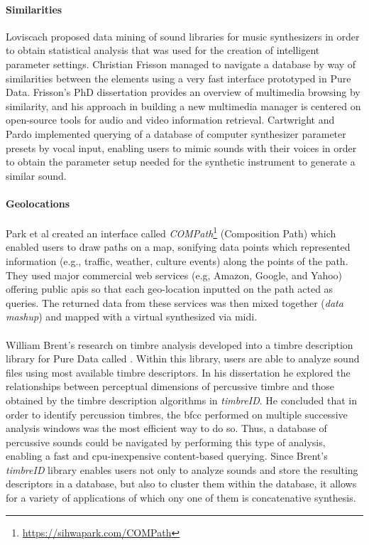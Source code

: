 \paragraph{Similarities}
Loviscach \parencite{Loviscach2008} proposed data mining of sound libraries for music synthesizers in order to obtain statistical analysis that was used for the creation of intelligent parameter settings. Christian Frisson \parencite{Frisson2010} managed to navigate a database by way of similarities between the elements using a very fast interface prototyped in Pure Data. Frisson's PhD dissertation \parencite{Frisson2015} provides an overview of multimedia browsing by similarity, and his approach in building a new multimedia manager is centered on open-source tools for audio and video information retrieval. Cartwright and Pardo \parencite{mcartwright:2014} implemented querying of a database of computer synthesizer parameter presets by vocal input, enabling users to mimic sounds with their voices in order to obtain the parameter setup needed for the synthetic instrument to generate a similar sound.

\paragraph{Geolocations}
Park et al \parencite{icmc/bbp2372.2010.002} created an interface called \textit{COMPath}\footnote{\url{https://sihwapark.com/COMPath}} (Composition Path) which enabled users to draw paths on a map, sonifying data points which represented information (e.g., traffic, weather, culture events) along the points of the path. They used major commercial web services (e.g, Amazon, Google, and Yahoo) offering public \glspl{api} so that each geo-location inputted on the path acted as queries. The returned data from these services was then mixed together (\textit{data mashup}) and mapped with a virtual synthesized via \gls{midi}.

\paragraph{}
William Brent's research on timbre analysis \parencite{Brent/2010/phdthesis} developed into a timbre description library for Pure Data called  \parencite{icmc/bbp2372.2010.044}. Within this library, users are able to analyze sound files using most available timbre descriptors. In his dissertation he explored the relationships between perceptual dimensions of percussive timbre and those obtained by the timbre description algorithms in \textit{timbreID}. He concluded that in order to identify percussion timbres, the \gls{bfcc} performed on multiple successive analysis windows was the most efficient way to do so. Thus, a database of percussive sounds could be navigated by performing this type of analysis, enabling a fast and \gls{cpu}-inexpensive content-based querying. Since Brent's \textit{timbreID} library enables users not only to analyze sounds and store the resulting descriptors in a database, but also to cluster them within the database, it allows for a variety of applications of which ony one of them is concatenative synthesis.


